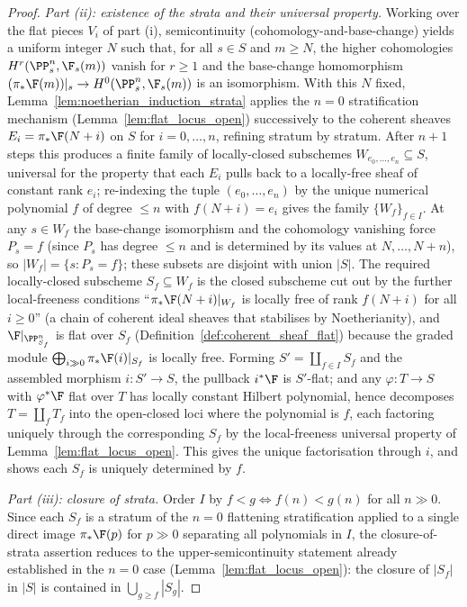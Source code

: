 \begin{proof}
  \emph{Part (ii): existence of the strata and their universal property.}
  Working over the flat pieces \(V_i\) of part (i), semicontinuity
  (cohomology-and-base-change) yields a uniform integer \(N\) such that, for all
  \(s \in S\) and \(m \ge N\), the higher cohomologies \(H^r(\PP^n_s, \F_s(m))\)
  vanish for \(r \ge 1\) and the base-change homomorphism
  \((\pi_* \F(m))|_s \to H^0(\PP^n_s, \F_s(m))\) is an isomorphism.  With this
  \(N\) fixed, Lemma~\ref{lem:noetherian_induction_strata} applies the \(n = 0\)
  stratification mechanism (Lemma~\ref{lem:flat_locus_open}) successively to the
  coherent sheaves \(E_i = \pi_* \F(N+i)\) on \(S\) for \(i = 0, \dots, n\),
  refining stratum by stratum.  After \(n+1\) steps this produces a finite
  family of locally-closed subschemes \(W_{e_0, \dots, e_n} \subseteq S\),
  universal for the property that each \(E_i\) pulls back to a locally-free sheaf
  of constant rank \(e_i\); re-indexing the tuple \((e_0, \dots, e_n)\) by the
  unique numerical polynomial \(f\) of degree \(\le n\) with \(f(N+i) = e_i\)
  gives the family \(\{W_f\}_{f \in I}\).  At any \(s \in W_f\) the base-change
  isomorphism and the cohomology vanishing force \(P_s = f\) (since \(P_s\) has
  degree \(\le n\) and is determined by its values at \(N, \dots, N+n\)), so
  \(|W_f| = \{s : P_s = f\}\); these subsets are disjoint with union \(|S|\).
  The required locally-closed subscheme \(S_f \subseteq W_f\) is the closed
  subscheme cut out by the further local-freeness conditions
  ``\(\pi_* \F(N+i)|_{W_f}\) is locally free of rank \(f(N+i)\) for all
  \(i \ge 0\)'' (a chain of coherent ideal sheaves that stabilises by
  Noetherianity), and \(\F|_{\PP^n_{S_f}}\) is flat over \(S_f\)
  (Definition~\ref{def:coherent_sheaf_flat}) because the graded module
  \(\bigoplus_{i \gg 0} \pi_* \F(i)|_{S_f}\) is locally free.  Forming
  \(S' = \coprod_{f \in I} S_f\) and the assembled morphism \(i : S' \to S\),
  the pullback \(i^* \F\) is \(S'\)-flat; and any \(\varphi : T \to S\) with
  \(\varphi^* \F\) flat over \(T\) has locally constant Hilbert polynomial, hence
  decomposes \(T = \coprod_f T_f\) into the open-closed loci where the polynomial
  is \(f\), each factoring uniquely through the corresponding \(S_f\) by the
  local-freeness universal property of Lemma~\ref{lem:flat_locus_open}.  This
  gives the unique factorisation through \(i\), and shows each \(S_f\) is
  uniquely determined by \(f\).

  \emph{Part (iii): closure of strata.}
  Order \(I\) by \(f < g \iff f(n) < g(n)\) for all \(n \gg 0\).  Since each
  \(S_f\) is a stratum of the \(n = 0\) flattening stratification applied to a
  single direct image \(\pi_* \F(p)\) for \(p \gg 0\) separating all polynomials
  in \(I\), the closure-of-strata assertion reduces to the upper-semicontinuity
  statement already established in the \(n = 0\) case
  (Lemma~\ref{lem:flat_locus_open}): the closure of \(|S_f|\) in \(|S|\) is
  contained in \(\bigcup_{g \ge f} |S_g|\).
\end{proof}

